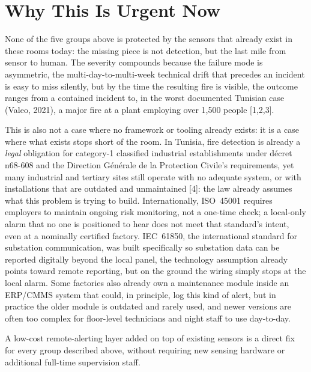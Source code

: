 \documentclass[10pt]{article}
\begin{document}
\section{Why This Is Urgent Now}
None of the five groups above is protected by the sensors that already exist in these rooms today: the missing piece is not detection, but the last mile from sensor to human. The severity compounds because the failure mode is asymmetric, the multi-day-to-multi-week technical drift that precedes an incident is easy to miss silently, but by the time the resulting fire is visible, the outcome ranges from a contained incident to, in the worst documented Tunisian case (Valeo, 2021), a major fire at a plant employing over 1,500 people [1,2,3].

This is also not a case where no framework or tooling already exists: it is a case where what exists stops short of the room. In Tunisia, fire detection is already a \emph{legal} obligation for category-1 classified industrial establishments under d\'ecret n\textdegree{}68-608 and the Direction G\'en\'erale de la Protection Civile's requirements, yet many industrial and tertiary sites still operate with no adequate system, or with installations that are outdated and unmaintained [4]: the law already assumes what this problem is trying to build. Internationally, ISO~45001 requires employers to maintain ongoing risk monitoring, not a one-time check; a local-only alarm that no one is positioned to hear does not meet that standard's intent, even at a nominally certified factory. IEC~61850, the international standard for substation communication, was built specifically so substation data can be reported digitally beyond the local panel, the technology assumption already points toward remote reporting, but on the ground the wiring simply stops at the local alarm. Some factories also already own a maintenance module inside an ERP/CMMS system that could, in principle, log this kind of alert, but in practice the older module is outdated and rarely used, and newer versions are often too complex for floor-level technicians and night staff to use day-to-day.

A low-cost remote-alerting layer added on top of existing sensors is a direct fix for every group described above, without requiring new sensing hardware or additional full-time supervision staff.
\end{document}
